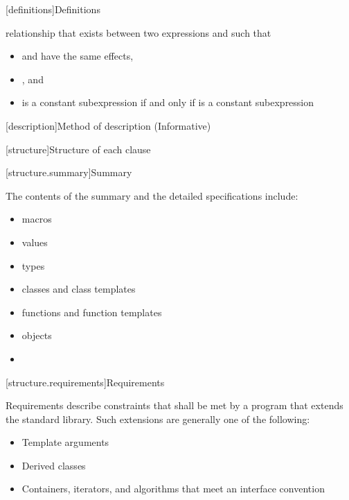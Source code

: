 \setcounter{section}{2}
[definitions]{Definitions}


{\color{addclr}
\setcounter{subsection}{10}
%
relationship that exists between two expressions  and  such that
\begin{itemize}
\item
{} and  have the same effects,

\item
{}, and

\item
{} is a constant subexpression if and only if  is a constant subexpression
\end{itemize}
} %

[description]{Method of description (Informative)}

[structure]{Structure of each clause}

\setcounter{subsubsection}{1}
[structure.summary]{Summary}


\setcounter{Paras}{1}
\pnum
The contents of the summary and the detailed specifications include:

\begin{itemize}
\item macros
\item values
\item types
\item classes and class templates
\item functions and function templates
\item objects
\item {}
\end{itemize}

[structure.requirements]{Requirements}


\pnum
{}%
Requirements describe constraints that shall be met by a \Cpp{} program that extends the standard library.
Such extensions are generally one of the following:

\begin{itemize}
\item Template arguments
\item Derived classes
\item Containers, iterators, and algorithms that meet an interface convention 
\end{itemize}

